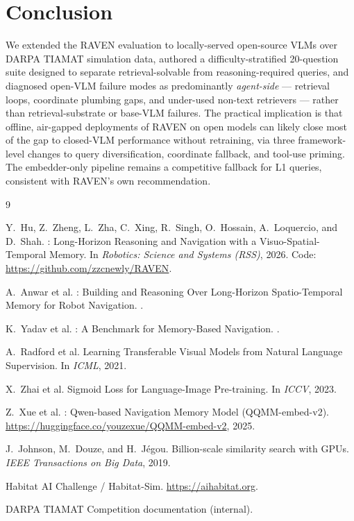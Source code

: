 \documentclass[11pt]{article}
\begin{document}
\section{Conclusion}
We extended the RAVEN evaluation to locally-served open-source VLMs over DARPA TIAMAT simulation data, authored a difficulty-stratified 20-question suite designed to separate retrieval-solvable from reasoning-required queries, and diagnosed open-VLM failure modes as predominantly \emph{agent-side} --- retrieval loops, coordinate plumbing gaps, and under-used non-text retrievers --- rather than retrieval-substrate or base-VLM failures. The practical implication is that offline, air-gapped deployments of RAVEN on open models can likely close most of the gap to closed-VLM performance without retraining, via three framework-level changes to query diversification, coordinate fallback, and tool-use priming. The embedder-only pipeline remains a competitive fallback for L1 queries, consistent with RAVEN's own recommendation.

\begin{thebibliography}{9}

Y.~Hu, Z.~Zheng, L.~Zha, C.~Xing, R.~Singh, O.~Hossain, A.~Loquercio, and D.~Shah.
: Long-Horizon Reasoning and Navigation with a Visuo-Spatial-Temporal Memory.
\newblock In \emph{Robotics: Science and Systems (RSS)}, 2026.
\newblock Code: \url{https://github.com/zzcnewly/RAVEN}.

A.~Anwar et al.
: Building and Reasoning Over Long-Horizon Spatio-Temporal Memory for Robot Navigation.
.

K.~Yadav et al.
: A Benchmark for Memory-Based Navigation.
.

A.~Radford et al.
\newblock Learning Transferable Visual Models from Natural Language Supervision.
\newblock In \emph{ICML}, 2021.

X.~Zhai et al.
\newblock Sigmoid Loss for Language-Image Pre-training.
\newblock In \emph{ICCV}, 2023.

Z.~Xue et al.
: Qwen-based Navigation Memory Model (QQMM-embed-v2).
\newblock \url{https://huggingface.co/youzexue/QQMM-embed-v2}, 2025.

J.~Johnson, M.~Douze, and H.~J\'egou.
\newblock Billion-scale similarity search with {GPUs}.
\newblock \emph{IEEE Transactions on Big Data}, 2019.

Habitat AI Challenge / Habitat-Sim.
\newblock \url{https://aihabitat.org}.

{DARPA TIAMAT} Competition documentation (internal).

\end{thebibliography}
\end{document}
